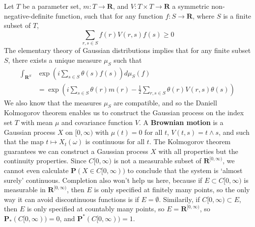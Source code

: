 \begin{example}
    Let $T$ be a parameter set, $m: T \to \mathbf{R}$, and $V: T \times T \to \mathbf{R}$ a symmetric non-negative-definite function, such that for any function $f: S \to \mathbf{R}$, where $S$ is a finite subset of $T$,
    \[ \sum_{r,s \in S} f(r) V(r,s) f(s) \geq 0 \]
    The elementary theory of Gaussian distributions implies that for any finite subset $S$, there exists a unique measure $\mu_S$ such that
    \begin{align*}
        \int_{\mathbf{R}^S} &\exp \left( i \sum_{s \in S} \theta(s) f(s) \right) d\mu_S(f)\\
        &= \exp \left( i \sum_{s \in S} \theta(r) m(r) - \frac{1}{2} \sum_{r,s \in S} \theta(r) V(r,s) \theta(s) \right)
    \end{align*}
    We also know that the measures $\mu_S$ are compatible, and so the Daniell Kolmogorov theorem enables us to construct the Gaussian process on the index set $T$ with mean $\mu$ and covariance function $V$. A {\bf Brownian motion} is a Gaussian process $X$ on $[0,\infty)$ with $\mu(t) = 0$ for all $t$, $V(t,s) = t \wedge s$, and such that the map $t \mapsto X_t(\omega)$ is continuous for all $t$. The Kolmogorov theorem guarantees we can construct a Gaussian process $X$ with all properties but the continuity properties. Since $C[0,\infty)$ is not a measurable subset of $\mathbf{R}^{[0,\infty)}$, we cannot even calculate $\mathbf{P}(X \in C[0,\infty))$ to conclude that the system is `almost surely' continuous. Completion also won't help us here, because if $E \subset C[0,\infty)$ is measurable in $\mathbf{R}^{[0,\infty)}$, then $E$ is only specified at finitely many points, so the only way it can avoid discontinuous functions is if $E = \emptyset$. Similarily, if $C[0,\infty) \subset E$, then $E$ is only specified at countably many points, so $E = \mathbf{R}^{[0,\infty)}$, so $\mathbf{P}_*(C[0,\infty)) = 0$, and $\mathbf{P}^*(C[0,\infty)) = 1$.
\end{example}


